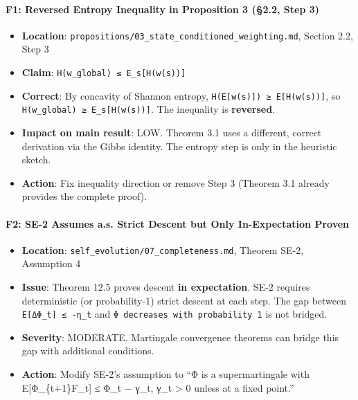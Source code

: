 \documentclass[
  12pt,
]{ctexart}
\providecommand{\tightlist}{%
  \setlength{\itemsep}{0pt}\setlength{\parskip}{0pt}}
\begin{document}
\paragraph{F1: Reversed Entropy Inequality in Proposition 3 (§2.2, Step
3)}\label{f1-reversed-entropy-inequality-in-proposition-3-2.2-step-3}

\begin{itemize}
\tightlist
\item
  \textbf{Location}:
  \texttt{propositions/03\_state\_conditioned\_weighting.md}, Section
  2.2, Step 3
\item
  \textbf{Claim}: \texttt{H(w\_global)\ ≤\ E\_s{[}H(w(s)){]}}
\item
  \textbf{Correct}: By concavity of Shannon entropy,
  \texttt{H(E{[}w(s){]})\ ≥\ E{[}H(w(s)){]}}, so
  \texttt{H(w\_global)\ ≥\ E\_s{[}H(w(s)){]}}. The inequality is
  \textbf{reversed}.
\item
  \textbf{Impact on main result}: LOW. Theorem 3.1 uses a different,
  correct derivation via the Gibbs identity. The entropy step is only in
  the heuristic sketch.
\item
  \textbf{Action}: Fix inequality direction or remove Step 3 (Theorem
  3.1 already provides the complete proof).
\end{itemize}

\paragraph{F2: SE-2 Assumes a.s. Strict Descent but Only In-Expectation
Proven}\label{f2-se-2-assumes-a.s.-strict-descent-but-only-in-expectation-proven}

\begin{itemize}
\tightlist
\item
  \textbf{Location}: \texttt{self\_evolution/07\_completeness.md},
  Theorem SE-2, Assumption 4
\item
  \textbf{Issue}: Theorem 12.5 proves descent \textbf{in expectation}.
  SE-2 requires deterministic (or probability-1) strict descent at each
  step. The gap between \texttt{E{[}ΔΦ\_t{]}\ ≤\ -η\_t} and
  \texttt{Φ\ decreases\ with\ probability\ 1} is not bridged.
\item
  \textbf{Severity}: MODERATE. Martingale convergence theorems can
  bridge this gap with additional conditions.
\item
  \textbf{Action}: Modify SE-2's assumption to ``Φ is a supermartingale
  with E{[}Φ\_\{t+1\}\textbar F\_t{]} ≤ Φ\_t − γ\_t, γ\_t \textgreater{}
  0 unless at a fixed point.''
\end{itemize}
\end{document}
